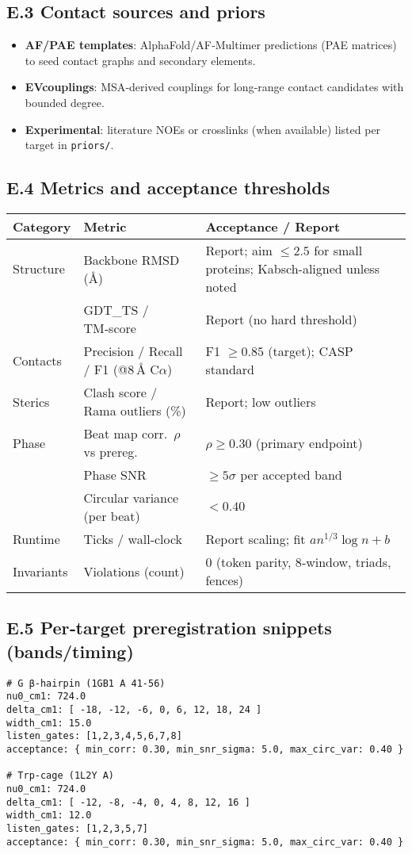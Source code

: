 \documentclass[12pt,a4paper]{article}
\begin{document}
\subsection*{E.3 Contact sources and priors}
\begin{itemize}
  \item \textbf{AF/PAE templates}: AlphaFold/AF‑Multimer predictions (PAE matrices) to seed contact graphs and secondary elements.
  \item \textbf{EVcouplings}: MSA‑derived couplings for long‑range contact candidates with bounded degree.
  \item \textbf{Experimental}: literature NOEs or crosslinks (when available) listed per target in \texttt{priors/}.
\end{itemize}

\subsection*{E.4 Metrics and acceptance thresholds}
\begin{center}
\renewcommand{\arraystretch}{1.15}
\begin{tabular}{@{}lll@{}}
\toprule
Category & Metric & Acceptance / Report \\
\midrule
Structure & Backbone RMSD (Å) & Report; aim $\le 2.5$ for small proteins; Kabsch-aligned unless noted \cite{Kabsch1976} \\
 & GDT\_TS / TM‑score & Report (no hard threshold) \\
Contacts & Precision / Recall / F1 (@8\,Å C$\alpha$) & F1 $\ge 0.85$ (target); CASP standard \cite{Schaarschmidt2018} \\
Sterics & Clash score / Rama outliers (\%) & Report; low outliers \\
Phase & Beat map corr.\ $\rho$ vs prereg. & $\rho \ge 0.30$ (primary endpoint) \\
 & Phase SNR & $\ge 5\sigma$ per accepted band \\
 & Circular variance (per beat) & $< 0.40$ \\
Runtime & Ticks / wall‑clock & Report scaling; fit $a n^{1/3}\log n + b$ \\
Invariants & Violations (count) & 0 (token parity, 8‑window, triads, fences) \\
\bottomrule
\end{tabular}
\end{center}

\subsection*{E.5 Per‑target preregistration snippets (bands/timing)}
\begin{verbatim}
# G β-hairpin (1GB1 A 41-56)
nu0_cm1: 724.0
delta_cm1: [ -18, -12, -6, 0, 6, 12, 18, 24 ]
width_cm1: 15.0
listen_gates: [1,2,3,4,5,6,7,8]
acceptance: { min_corr: 0.30, min_snr_sigma: 5.0, max_circ_var: 0.40 }

# Trp-cage (1L2Y A)
nu0_cm1: 724.0
delta_cm1: [ -12, -8, -4, 0, 4, 8, 12, 16 ]
width_cm1: 12.0
listen_gates: [1,2,3,5,7]
acceptance: { min_corr: 0.30, min_snr_sigma: 5.0, max_circ_var: 0.40 }
\end{verbatim}
\end{document}
